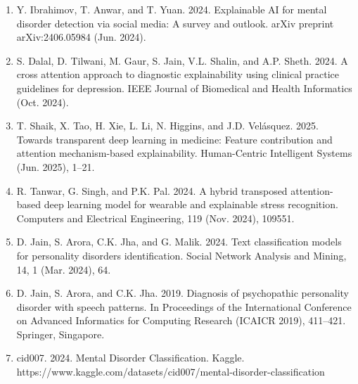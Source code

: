 \documentclass[conference]{IEEEtran}
\begin{document}
\begin{enumerate}
\item
  Y. Ibrahimov, T. Anwar, and T. Yuan. 2024. Explainable AI for mental disorder detection via social media: A survey and outlook. arXiv preprint arXiv:2406.05984 (Jun. 2024).
\item
  S. Dalal, D. Tilwani, M. Gaur, S. Jain, V.L. Shalin, and A.P. Sheth. 2024. A cross attention approach to diagnostic explainability using clinical practice guidelines for depression. IEEE Journal of Biomedical and Health Informatics (Oct. 2024).
\item
  T. Shaik, X. Tao, H. Xie, L. Li, N. Higgins, and J.D. Velásquez. 2025. Towards transparent deep learning in medicine: Feature contribution and attention mechanism-based explainability. Human-Centric Intelligent Systems (Jun. 2025), 1--21.
\item
  R. Tanwar, G. Singh, and P.K. Pal. 2024. A hybrid transposed attention-based deep learning model for wearable and explainable stress recognition. Computers and Electrical Engineering, 119 (Nov. 2024), 109551.
\item
  D. Jain, S. Arora, C.K. Jha, and G. Malik. 2024. Text classification models for personality disorders identification. Social Network Analysis and Mining, 14, 1 (Mar. 2024), 64.
\item
  D. Jain, S. Arora, and C.K. Jha. 2019. Diagnosis of psychopathic personality disorder with speech patterns. In Proceedings of the International Conference on Advanced Informatics for Computing Research (ICAICR 2019), 411--421. Springer, Singapore.
\item
  cid007. 2024. Mental Disorder Classification. Kaggle. https://www.kaggle.com/datasets/cid007/mental-disorder-classification
\end{enumerate}
\end{document}
